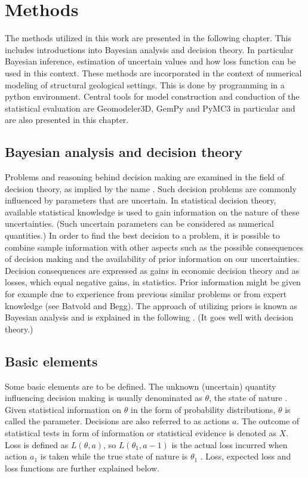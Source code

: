     \chapter{Methods}

    The methods utilized in this work are presented in the following chapter. This includes introductions into Bayesian analysis and decision theory. In particular Bayesian inference, estimation of uncertain values and how loss function can be used in this context. These methods are incorporated in the context of numerical modeling of structural geological settings. This is done by programming in a python environment. Central tools for model construction and conduction of the statistical evaluation are Geomodeler3D, GemPy and PyMC3 in particular and are also presented in this chapter.
    
        \section{Bayesian analysis and decision theory}
	    Problems and reasoning behind decision making are examined in the field of decision theory, as implied by the name \cite{berger2013stat}. Such decision problems are commonly influenced by parameters that are uncertain. In statistical decision theory, available statistical knowledge is used to gain information on the nature of these uncertainties. (Such uncertain parameters can be considered as numerical quantities.) In order to find the best decision to a problem, it is possible to combine sample information with other aspects such as the possible consequences of decision making and the availability of prior information on our uncertainties. Decision consequences are expressed as gains in economic decision theory and as losses, which equal negative gains, in statistics. Prior information might be given for example due to experience from previous similar problems or from expert knowledge (see Batvold and Begg). The approach of utilizing priors is known as Bayesian analysis and is explained in the following \cite{berger2013stat}. (It goes well with decision theory.)
	    
	    \section{Basic elements}
	    Some basic elements are to be defined. The unknown (uncertain) quantity influencing decision making is usually denominated as $\theta$, the state of nature \cite{berger2013stat}. Given statistical information on $\theta$ in the form of probability distributions, $\theta$ is called the parameter. 
	    Decisions are also referred to as actions $a$.
	    The outcome of statistical tests in form of information or statistical evidence is denoted as $X$.	    
	    Loss is defined as $L(\theta,a)$, so $L(\theta_1,a-1)$ is the actual loss incurred when action $a_1$ is taken while the true state of nature is $\theta_1$ \cite{berger2013stat}. Loss, expected loss and loss functions are further explained below.  
        
